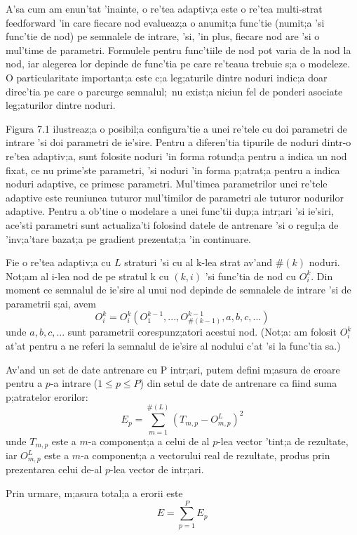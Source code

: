 A'sa cum am enun'tat 'inainte, o re'tea adaptiv;a este o re'tea multi-strat feedforward 'in care fiecare nod evalueaz;a o anumit;a func'tie (numit;a 'si func'tie de nod) pe semnalele de intrare, 'si, 'in plus, fiecare nod are 'si o mul'time de parametri. Formulele pentru func'tiile de nod pot varia de la nod la nod, iar alegerea lor depinde de func'tia pe care re'teaua trebuie s;a o modeleze. O particularitate important;a este c;a leg;aturile dintre noduri indic;a doar direc'tia pe care o parcurge semnalul;\ nu exist;a niciun fel de ponderi asociate leg;aturilor dintre noduri.
\par
Figura 7.1 ilustreaz;a o posibil;a configura'tie a unei re'tele cu doi parametri de intrare 'si doi parametri de ie'sire. Pentru a diferen'tia tipurile de noduri dintr-o re'tea adaptiv;a, sunt folosite noduri 'in forma rotund;a pentru a indica un nod fixat, ce nu prime'ste parametri, 'si noduri 'in forma p;atrat;a pentru a indica noduri adaptive, ce primesc parametri. Mul'timea parametrilor unei re'tele adaptive este reuniunea tuturor mul'timilor de parametri ale tuturor nodurilor adaptive. Pentru a ob'tine o modelare a unei func'tii dup;a intr;ari 'si ie'siri, ace'sti parametri sunt actualiza'ti folosind datele de antrenare 'si o regul;a de 'inv;a'tare bazat;a pe gradient prezentat;a 'in continuare.
\par
Fie o re'tea adaptiv;a cu $L$ straturi 'si cu al k-lea strat av'and $\#(k)$ noduri. Not;am al i-lea nod de pe stratul k cu $(k, i)$ 'si func'tia de nod cu $O_{i}^{k}$. Din moment ce semnalul de ie'sire al unui nod depinde de semnalele de intrare 'si de parametrii s;ai, avem
\begin{equation}
O_{i}^{k} = O_{i}^{k} (O_{1}^{k-1}, ... , O_{\#(k-1)}^{k-1}, a, b, c, ...)
\end{equation}
unde $a, b, c, ...$ sunt parametrii corespunz;atori acestui nod. (Not;a: am folosit $O_{i}^{k}$ at'at pentru a ne referi la semnalul de ie'sire al nodului c'at 'si la func'tia sa.)
\par
Av'and un set de date antrenare cu P intr;ari, putem defini m;asura de eroare pentru a $p$-a intrare ($1 \leq p \leq P$) din setul de date de antrenare ca fiind suma p;atratelor erorilor:
\begin{equation}
E_{p} = \displaystyle \sum_{m = 1}^{\#(L)} (T_{m, p} - O_{m, p}^{L})^{2}
\end{equation}
unde $T_{m, p}$ este a $m$-a component;a a celui de al $p$-lea vector 'tint;a de rezultate, iar $O_{m, p}^{L}$ este a $m$-a component;a a vectorului real de rezultate, produs prin prezentarea celui de-al $p$-lea vector de intr;ari.
\par
Prin urmare, m;asura total;a a erorii este
\begin{equation}
E = \displaystyle \sum_{p=1}^{P} E_{p}
\end{equation}

